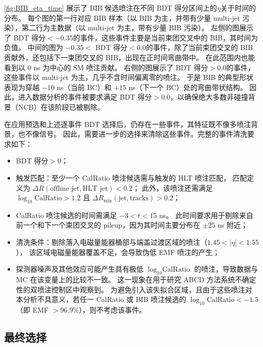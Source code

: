 \autoref{fig:BIB_eta_time} 展示了 BIB 候选喷注在不同 BDT 得分区间上的$\eta$关于时间的分布。
每个图的第一行对应 BIB 样本（以 BIB 为主，并带有少量 multi-jet 污染），第二行为主数据（以 multi-jet 为主，带有少量 BIB 污染）。
左侧的图展示了 BDT 得分$< -0.35$的事件，这些事件主要是当前束团交叉中的 BIB，其时间为负值。
中间的图为 $-0.35 <$ BDT 得分$< 0.0$的事件，除了当前束团交叉的 BIB 贡献外，还包括下一束团交叉的 BIB，出现在正时间弯曲带中。
在此范围内也能看到以 $0$ ns 为中心的 SM 喷注贡献。
右侧的图展示了 BDT 得分$> 0.0$的事件，这些事件以 multi-jet 为主，几乎不含时间偏离零的喷注。
于是 BIB 的典型形状表现为穿越 $-10$ ns（当前 BC）和 $+15$ ns（下一个 BC）处的弯曲带状结构。
因此，进入数据分析的事件被要求满足 BDT 得分$> 0.0$，以确保绝大多数非碰撞背景（NCB）在该阶段已被剔除。

在应用预选和上述逐事件 BDT 选择后，仍存在一些事件，其特征既不像多喷注背景，也不像信号。
因此，需要进一步的选择来清除这些事件。完整的事件清洗要求如下：

\begin{itemize}
    \item BDT 得分$> 0$；
    \item 触发匹配：至少一个 CalRatio 喷注候选需与触发的 HLT 喷注匹配，
          匹配定义为 $\Delta R(\text{offline jet}, \text{HLT jet}) < 0.2$；
          此外，该喷注还需满足 $\log_{10} \text{CalRatio} > 1.2$ 且
          $\Delta R_{\min}(\text{jet}, \text{tracks}) > 0.2$；
    \item CalRatio 喷注候选的时间需满足 $-3 < t < 15$ ns。
          此时间要求用于剔除来自前一个和下一个束团交叉的 pileup，因为其时间主要分布在 $\pm 25$ ns 附近；
    \item 清洗条件：剔除落入电磁量能器桶部与端盖过渡区域的喷注（$1.45 < |\eta| < 1.55$），
          该区域电磁量能器覆盖不足，会导致伪低 EMF 喷注的产生；
    \item 探测器噪声及其他效应可能产生具有极低 $\log_{10} \text{CalRatio}$ 的喷注，导致数据与 MC 在该变量上的比较不一致。
          这一现象在用于研究 ABCD 方法系统不确定性的双喷注控制区中观察到。
          为避免引入该失拟合区域，且由于这些喷注对本分析不具意义，若任一 CalRatio 或 BIB 喷注候选的
          $\log_{10} \text{CalRatio} < -1.5$（即 EMF $> 96.9\%$），则不考虑该事件。
\end{itemize}


\subsection{最终选择}
\label{sec:Final_Selection}
